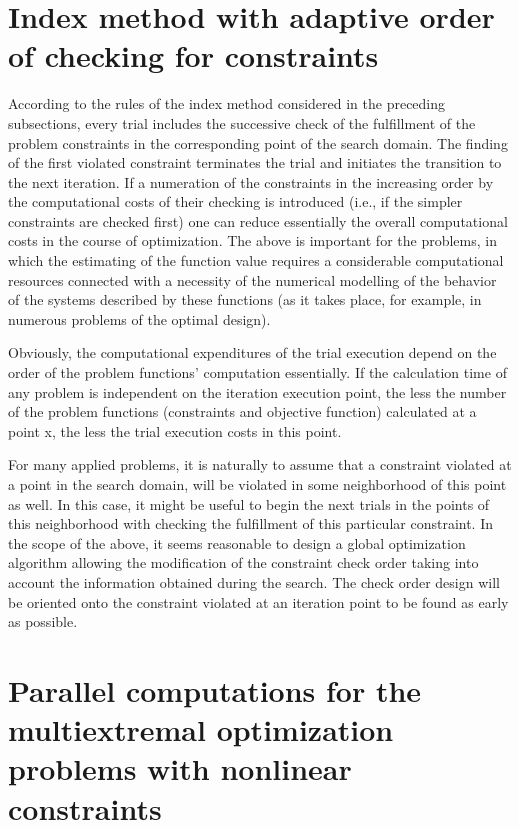 \documentclass[graybox]{svmult}
\begin{document}
\section{Index method with adaptive order of checking for constraints}
According to the rules of the index method considered in the preceding subsections, every trial includes the successive check of the fulfillment of the problem constraints in the corresponding point of the search domain. The finding of the first violated constraint terminates the trial and initiates the transition to the next iteration. If a numeration of the constraints in the increasing order by the computational costs of their checking is introduced (i.e., if the simpler constraints are checked first) one can reduce essentially the overall computational costs in the course of optimization. The above is important for the problems, in which the estimating of the function value requires a considerable computational resources connected with a necessity of the numerical modelling of the behavior of the systems described by these functions (as it takes place, for example, in numerous problems of the optimal design).

Obviously, the computational expenditures of the trial execution depend on the order of the problem functions’ computation essentially. If the calculation time of any problem is independent on the iteration execution point, the less the number of the problem functions (constraints and objective function) calculated at a point x, the less the trial execution costs in this point.

For many applied problems, it is naturally to assume that a constraint violated at a point in the search domain, will be violated in some neighborhood of this point as well. In this case, it might be useful to begin the next trials in the points of this neighborhood with checking the fulfillment of this particular constraint. In the scope of the above, it seems reasonable to design a global optimization algorithm allowing the modification of the constraint  check order taking into account the information obtained during the search. The check order design will be oriented onto the constraint violated at an iteration point to be found as early as possible.

\section{Parallel computations for the multiextremal optimization problems with nonlinear constraints}
\end{document}
